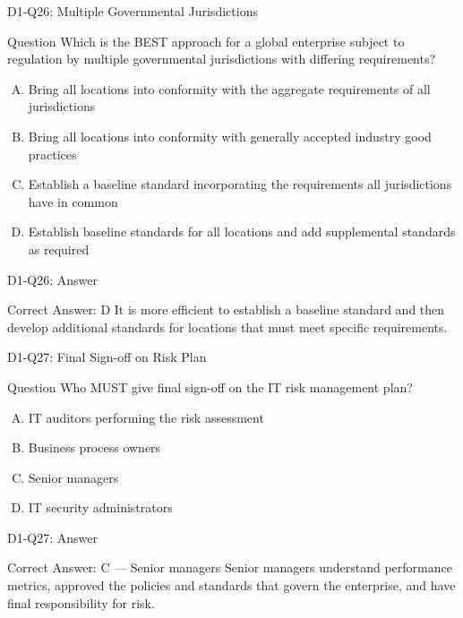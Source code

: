 \documentclass{beamer}
\begin{document}
	\begin{frame}{D1-Q26: Multiple Governmental Jurisdictions}
		\begin{block}{Question}
			Which is the BEST approach for a global enterprise subject to regulation by multiple governmental jurisdictions with differing requirements?
		\end{block}
		\begin{enumerate}[(A)]
			\item Bring all locations into conformity with the aggregate requirements of all jurisdictions
			\item Bring all locations into conformity with generally accepted industry good practices
			\item Establish a baseline standard incorporating the requirements all jurisdictions have in common
			\item Establish baseline standards for all locations and add supplemental standards as required
		\end{enumerate}
	\end{frame}
	\begin{frame}{D1-Q26: Answer}
		\begin{block}{Correct Answer: D}
			It is more efficient to establish a baseline standard and then develop additional standards for locations that must meet specific requirements.
		\end{block}
	\end{frame}
	
	\begin{frame}{D1-Q27: Final Sign-off on Risk Plan}
		\begin{block}{Question}
			Who MUST give final sign-off on the IT risk management plan?
		\end{block}
		\begin{enumerate}[(A)]
			\item IT auditors performing the risk assessment
			\item Business process owners
			\item Senior managers
			\item IT security administrators
		\end{enumerate}
	\end{frame}
	\begin{frame}{D1-Q27: Answer}
		\begin{block}{Correct Answer: C --- Senior managers}
			Senior managers understand performance metrics, approved the policies and standards that govern the enterprise, and have final responsibility for risk.
		\end{block}
	\end{frame}
	
\end{document}
